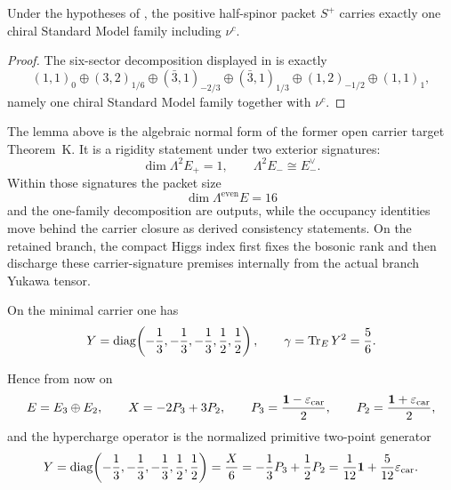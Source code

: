 \begin{corollary}
Under the hypotheses of , the positive half-spinor packet $S^+$
carries exactly one chiral Standard Model family including $\nu^c$.
\end{corollary}

\begin{proof}
The six-sector decomposition displayed in  is exactly
\[
(1,1)_0\oplus(3,2)_{1/6}\oplus(\bar 3,1)_{-2/3}\oplus(\bar 3,1)_{1/3}\oplus(1,2)_{-1/2}\oplus(1,1)_1,
\]
namely one chiral Standard Model family together with $\nu^c$.
\end{proof}

\begin{remark}
The lemma above is the algebraic normal form of the former open carrier target Theorem~K. It is a rigidity
statement under two exterior signatures:
\[
\dim \Lambda^2 E_+=1,
\qquad
\Lambda^2 E_- \cong E_-^\vee.
\]
Within those signatures the packet size
\[
\dim\Lambda^{\mathrm{even}}E=16
\]
and the one-family decomposition are outputs, while the occupancy identities move behind the
carrier closure as derived consistency statements. On the retained branch, the compact Higgs index
first fixes the bosonic rank and  then
discharge these carrier-signature premises internally from the actual branch Yukawa tensor.
\end{remark}

\begin{corollary}
On the minimal carrier one has
\[
Y
=
\mathrm{diag}\!\left(-\frac13,-\frac13,-\frac13,\frac12,\frac12\right),
\qquad
\gamma=\operatorname{Tr}_EY^2=\frac56.
\]
\end{corollary}

Hence from now on
\[
E=E_3\oplus E_2,
\qquad
X=-2P_3+3P_2,
\qquad
P_3=\frac{\mathbf 1-\varepsilon_{\mathrm{car}}}{2},
\qquad
P_2=\frac{\mathbf 1+\varepsilon_{\mathrm{car}}}{2},
\]
and the hypercharge operator is the normalized primitive two-point generator
\begin{equation}
\label{eq:explicit-hypercharge}
Y
=
\mathrm{diag}\!\left(-\frac13,-\frac13,-\frac13,\frac12,\frac12\right)
=
\frac{X}{6}
=
-\frac13 P_3+\frac12 P_2
=
\frac1{12}\mathbf 1+\frac5{12}\varepsilon_{\mathrm{car}}.
\end{equation}

